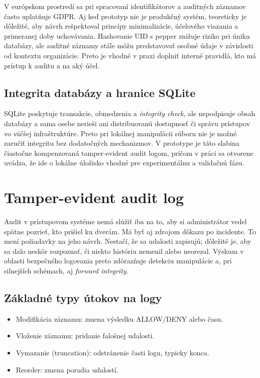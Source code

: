 \documentclass[journal,a4paper,onecolumn]{IEEEtran}
\begin{document}
V európskom prostredí sa pri spracovaní identifikátorov a auditných záznamov často uplatňuje GDPR. Aj keď prototyp nie je produkčný systém, teoreticky je dôležité, aby návrh rešpektoval princípy minimalizácie, účelového viazania a primeranej doby uchovávania. Hashovanie UID s pepper znižuje riziko pri úniku databázy, ale auditné záznamy stále môžu predstavovať osobné údaje v závislosti od kontextu organizácie. Preto je vhodné v praxi doplniť interné pravidlá, kto má prístup k auditu a na aký účel.


\subsection{Integrita databázy a hranice SQLite}

SQLite\cite{SQLiteSec} poskytuje transakcie, obmedzenia a \emph{integrity check}, ale nepodpisuje obsah databázy a sama osebe nerieši ani distribuovanú dostupnosť či správu prístupov vo väčšej infraštruktúre. Preto pri lokálnej manipulácii súboru nie je možné zaručiť integritu bez dodatočných mechanizmov. V prototype je táto slabina čiastočne kompenzovaná tamper-evident audit logom, pričom v práci sa otvorene uvádza, že ide o lokálne úložisko vhodné pre experimentálnu a validačnú fázu.

\section{Tamper-evident audit log}

Audit v prístupovom systéme nemá slúžiť iba na to, aby si administrátor vedel spätne pozrieť, kto prišiel ku dverám. Má byť aj zdrojom dôkazu po incidente. To mení požiadavky na jeho návrh. Nestačí, že sa udalosti zapisujú; dôležité je, aby sa dalo neskôr rozpoznať, či niekto históriu nemenil alebo neorezal. Výskum v oblasti bezpečného logovania preto zdôrazňuje detekciu manipulácie a, pri silnejších schémach, aj \emph{forward integrity}\cite{SchneierKelsey1999,NIST80092}.

\subsection{Základné typy útokov na logy}

\begin{itemize}[leftmargin=*,itemsep=2pt]
  \item Modifikácia záznamu: zmena výsledku ALLOW/DENY alebo času.
  \item Vloženie záznamu: pridanie falošnej udalosti.
  \item Vymazanie (truncation): odstránenie časti logu, typicky konca.
  \item Reorder: zmena poradia udalostí.
\end{itemize}
\end{document}
